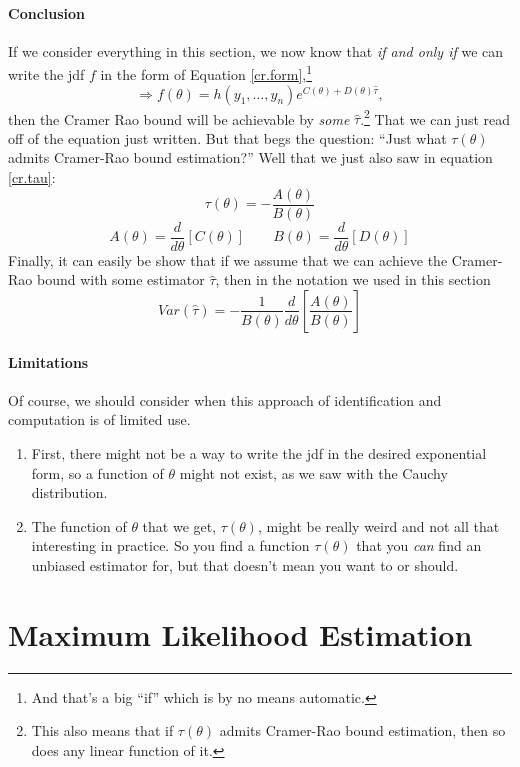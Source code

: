 \documentclass[a4paper,12pt]{scrartcl}
\begin{document}
\newpage
\paragraph{Conclusion} If we consider everything in this
section, we now know that \emph{if and only if} we can write the jdf
$f$ in the form of Equation
\ref{cr.form},\footnote{And that's a big ``if''
which is by no means automatic.}
   \[ \Rightarrow f(\theta) = h(y_1, \ldots, y_n) e^{C(\theta)
      + D(\theta)  \hat{\tau} },  \]
then the Cramer Rao bound will be achievable by \emph{some}
$\hat{\tau}$.\footnote{This also means that if $\tau(\theta)$ admits
Cramer-Rao bound estimation, then so does any linear function of it.}
That we can just read off of the equation just written.
But that begs the question: ``Just what $\tau(\theta)$ admits
Cramer-Rao bound estimation?'' Well that we just also saw in equation
\ref{cr.tau}:
\[ \tau(\theta) = -\frac{A(\theta)}{B(\theta)} \]
\[ A(\theta) = \frac{d}{d\theta}\left[ C(\theta)\right] \qquad
   B(\theta) = \frac{d}{d\theta}\left[ D(\theta)\right] \]
Finally, it can easily be show that if we assume that we can achieve
the Cramer-Rao bound with some estimator $\hat{\tau}$, then in
the notation we used in this section
   \[ Var(\hat{\tau}) = -\frac{1}{B(\theta)} \frac{d}{d\theta} \left[
      \frac{A(\theta)}{B(\theta)}\right] \]

\paragraph{Limitations} Of course, we should consider when this
approach of identification and computation is of limited use.
\begin{enumerate}
   \item First, there might not be a way to write the jdf in the
      desired exponential form, so a function of $\theta$ might not
      exist, as we saw with the Cauchy distribution.
   \item The function of $\theta$ that we get, $\tau(\theta)$, might
      be really weird and not all that interesting in practice. So
      you find a function $\tau(\theta)$ that you \emph{can}
      find an unbiased estimator for, but that doesn't mean you want to
      or should.
\end{enumerate}




\newpage

\section{Maximum Likelihood Estimation}
\end{document}

